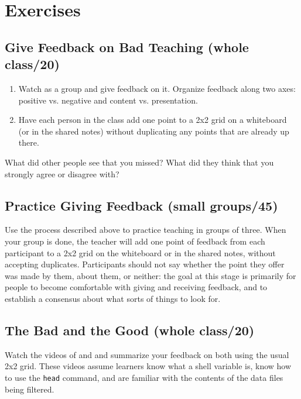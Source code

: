 \section{Exercises}\label{s:performance-exercises}

\subsection*{Give Feedback on Bad Teaching (whole class/20)}

\begin{enumerate}
\item
  Watch  as a group
  and give feedback on it. Organize feedback along two axes: positive
  vs. negative and content vs. presentation.
\item
  Have each person in the class add one point to a 2x2 grid on a
  whiteboard (or in the shared notes) without duplicating any points
  that are already up there.
\end{enumerate}

What did other people see that you missed? What did they think that you
strongly agree or disagree with?

\subsection*{Practice Giving Feedback (small groups/45)}

Use the process described above to practice teaching in groups of
three. When your group is done, the teacher will add one point of
feedback from each participant to a 2x2 grid on the whiteboard or in
the shared notes, without accepting duplicates. Participants should
not say whether the point they offer was made by them, about them, or
neither: the goal at this stage is primarily for people to become
comfortable with giving and receiving feedback, and to establish a
consensus about what sorts of things to look for.

\subsection*{The Bad and the Good (whole class/20)}

Watch the videos of 
and  and summarize your
feedback on both using the usual 2x2 grid. These videos assume
learners know what a shell variable is, know how to use the \texttt{head}
command, and are familiar with the contents of the data files being
filtered.

